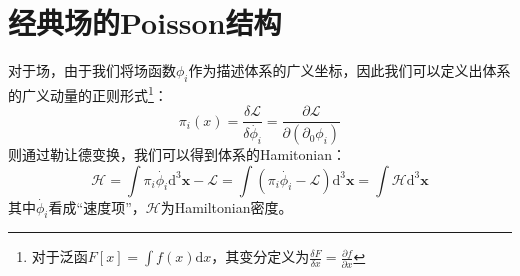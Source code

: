 \section{经典场的Poisson结构}
\par 对于场，由于我们将场函数$\phi_i$作为描述体系的广义坐标，因此我们可以定义出体系的广义动量的正则形式\footnote{
	对于泛函$\displaystyle{F[x]=\int f(x) \mathrm{d}x}$，其变分定义为$\displaystyle{\frac{\delta F}{\delta x}=\frac{\partial f}{\partial x}}$
}：
\begin{equation}
	\pi_i(x)=\frac{\delta\mathcal{L}}{\delta\dot{\phi_i}}=\frac{\partial\mathscr{L}}{\partial(\partial_0\phi_i)}
\end{equation}
则通过勒让德变换，我们可以得到体系的Hamitonian：
\begin{equation}
	\mathcal{H}=\int\pi_i\dot{\phi_i}\mathrm{d}^3\boldsymbol{x}-\mathcal{L}=\int(\pi_i\dot{\phi_i}-\mathscr{L})\mathrm{d}^3\boldsymbol{x}=\int\mathscr{H}\mathrm{d}^3\boldsymbol{x}
\end{equation}
其中$\dot{\phi_i}$看成“速度项”，$\mathscr{H}$为Hamiltonian密度。

